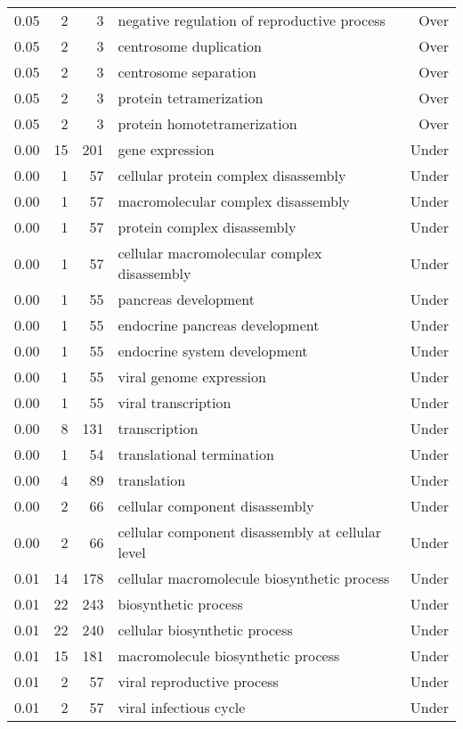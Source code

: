 \documentclass[10pt]{bmc_article}
\newenvironment{bmcformat}{\begin{raggedright}\baselineskip20pt\sloppy\setboolean{publ}{false}}{\end{raggedright}\baselineskip20pt\sloppy}
\begin{document}
\begin{bmcformat}
\begin{longtable}{rrrp{4cm}r}
  0.05 &   2 &   3 & negative regulation of reproductive process & Over \\ 
  0.05 &   2 &   3 & centrosome duplication & Over \\ 
  0.05 &   2 &   3 & centrosome separation & Over \\ 
  0.05 &   2 &   3 & protein tetramerization & Over \\ 
  0.05 &   2 &   3 & protein homotetramerization & Over \\ 
  0.00 &  15 & 201 & gene expression & Under \\ 
  0.00 &   1 &  57 & cellular protein complex disassembly & Under \\ 
  0.00 &   1 &  57 & macromolecular complex disassembly & Under \\ 
  0.00 &   1 &  57 & protein complex disassembly & Under \\ 
  0.00 &   1 &  57 & cellular macromolecular complex disassembly & Under \\ 
  0.00 &   1 &  55 & pancreas development & Under \\ 
  0.00 &   1 &  55 & endocrine pancreas development & Under \\ 
  0.00 &   1 &  55 & endocrine system development & Under \\ 
  0.00 &   1 &  55 & viral genome expression & Under \\ 
  0.00 &   1 &  55 & viral transcription & Under \\ 
  0.00 &   8 & 131 & transcription & Under \\ 
  0.00 &   1 &  54 & translational termination & Under \\ 
  0.00 &   4 &  89 & translation & Under \\ 
  0.00 &   2 &  66 & cellular component disassembly & Under \\ 
  0.00 &   2 &  66 & cellular component disassembly at cellular level & Under \\ 
  0.01 &  14 & 178 & cellular macromolecule biosynthetic process & Under \\ 
  0.01 &  22 & 243 & biosynthetic process & Under \\ 
  0.01 &  22 & 240 & cellular biosynthetic process & Under \\ 
  0.01 &  15 & 181 & macromolecule biosynthetic process & Under \\ 
  0.01 &   2 &  57 & viral reproductive process & Under \\ 
  0.01 &   2 &  57 & viral infectious cycle & Under \\ 

\end{longtable}
\end{bmcformat}
\end{document}
